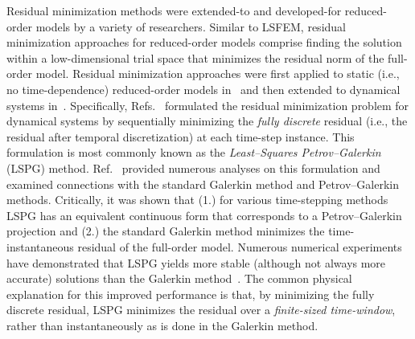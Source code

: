 \documentclass[3p,computermodern,10pt]{elsarticle}
\begin{document}
Residual minimization methods were extended-to and developed-for reduced-order models by a variety of researchers. Similar to LSFEM, residual minimization approaches for reduced-order models comprise finding the solution within a low-dimensional trial space that minimizes the residual norm of the full-order model. Residual minimization approaches were first applied to static (i.e., no time-dependence) reduced-order models in~\cite{legresley_1,legresley_2,legresley_3,bui_resmin_steady,rovas_thesis,carlberg_thesis,bui_thesis} and then extended to dynamical systems in~\cite{bui_thesis,bui_unsteady,carlberg_thesis,carlberg_gnat,carlberg_lspg,carlberg_lspg_v_galerkin}. Specifically, Refs.~\cite{bui_thesis,bui_unsteady,carlberg_thesis,carlberg_gnat,carlberg_lspg} formulated the residual minimization problem for dynamical systems by sequentially minimizing the \textit{fully discrete} residual (i.e., the residual after temporal discretization) at each time-step instance. This formulation is most commonly known as the \textit{Least--Squares Petrov--Galerkin} (LSPG) method. Ref.~\cite{carlberg_lspg_v_galerkin} provided numerous analyses on this formulation and examined connections with the standard Galerkin method and Petrov--Galerkin methods. Critically, it was shown that (1.) for various time-stepping methods LSPG has an equivalent continuous form that corresponds to a Petrov--Galerkin projection and (2.) the standard Galerkin method minimizes the time-instantaneous residual of the full-order model. Numerous numerical experiments have demonstrated that LSPG yields more stable (although not always more accurate) solutions than the Galerkin method~\cite{bui_thesis,carlberg_lspg_v_galerkin,carlberg_gnat,carlberg_thesis,parish_apg}. The common physical explanation for this improved performance is that, by minimizing the fully discrete residual, LSPG minimizes the residual over a \textit{finite-sized time-window}, rather than instantaneously as is done in the Galerkin method.
 
\end{document}
